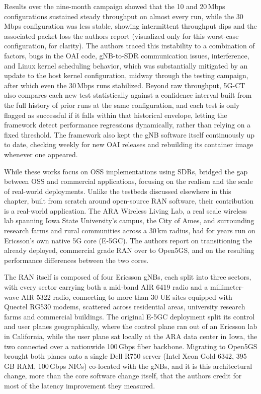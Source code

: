 Results over the nine-month campaign showed that the 10 and 20\,Mbps configurations sustained steady throughput on almost every run, while the 30\,Mbps configuration was less stable, showing intermittent throughput dips and the associated packet loss the authors report (visualized only for this worst-case configuration, for clarity). The authors traced this instability to a combination of factors, bugs in the \gls{OAI} code, gNB-to-\gls{SDR} communication issues, interference, and Linux kernel scheduling behavior, which was substantially mitigated by an update to the host kernel configuration, midway through the testing campaign, after which even the 30\,Mbps runs stabilized. Beyond raw throughput, 5G-CT also compares each new test statistically against a confidence interval built from the full history of prior runs at the same configuration, and each test is only flagged as successful if it falls within that historical envelope, letting the framework detect performance regressions dynamically, rather than relying on a fixed threshold. The framework also kept the \gls{gNB} software itself continuously up to date, checking weekly for new \gls{OAI} releases and rebuilding its container image whenever one appeared.

While these works focus on \gls{OSS} implementations using \glspl{SDR}, \textcite{zu2025realworld} bridged the gap between \gls{OSS} and commercial applications, focusing on the realism and the scale of real-world deployments. Unlike the testbeds discussed elsewhere in this chapter, built from scratch around open-source \gls{RAN} software, their contribution is a real-world application. The ARA Wireless Living Lab, a real scale wireless lab spanning Iowa State University's campus, the City of Ames, and surrounding research farms and rural communities across a 30\,km radius, had for years run on Ericsson's own native 5G core (E-5GC). The authors report on transitioning the already deployed, commercial grade \gls{RAN} over to Open5GS, and on the resulting performance differences between the two cores.

The \gls{RAN} itself is composed of four Ericsson \glspl{gNB}, each split into three sectors, with every sector carrying both a mid-band AIR 6419 radio and a millimeter-wave AIR 5322 radio, connecting to more than 30 \gls{UE} sites equipped with Quectel RG530 modems, scattered across residential areas, university research farms and commercial buildings. The original E-5GC deployment split its control and user planes geographically, where the control plane ran out of an Ericsson lab in California, while the user plane sat locally at the ARA data center in Iowa, the two connected over a nationwide 100\,Gbps fiber backbone. Migrating to Open5GS brought both planes onto a single Dell R750 server (Intel Xeon Gold 6342, 395\,GB RAM, 100\,Gbps NICs) co-located with the \glspl{gNB}, and it is this architectural change, more than the core software change itself, that the authors credit for most of the latency improvement they measured.

